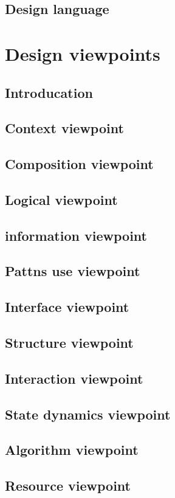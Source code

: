 \documentclass{scrreprt}
\begin{document}
\section{Design language}

\chapter{Design viewpoints}

\section{Introducation}

\section{Context viewpoint}

\section{Composition viewpoint}

\section{Logical viewpoint}

\section{information viewpoint}

\section{Pattns use viewpoint}

\section{Interface viewpoint}

\section{Structure viewpoint}

\section{Interaction viewpoint}

\section{State dynamics viewpoint}

\section{Algorithm viewpoint}

\section{Resource viewpoint}
\end{document}
